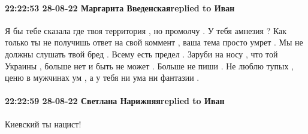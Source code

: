  
 
 
 
 

\paragraph{22:22:53 28-08-22 Маргарита Введенскаяreplied to Иван}

Я бы тебе сказала где твоя территория , но промолчу . У тебя амнезия ? Как
только ты не получишь ответ на свой коммент , ваша тема просто умрет . Мы не
должны слушать твой бред . Всему есть предел . Заруби на носу , что той Украины
, больше нет и быть не может . Больше не пиши . Не люблю тупых , ценю в
мужчинах ум , а у тебя ни ума ни фантазии .

\paragraph{22:22:59 28-08-22 Светлана Нарижняяreplied to Иван}

Киевский ты нацист!
